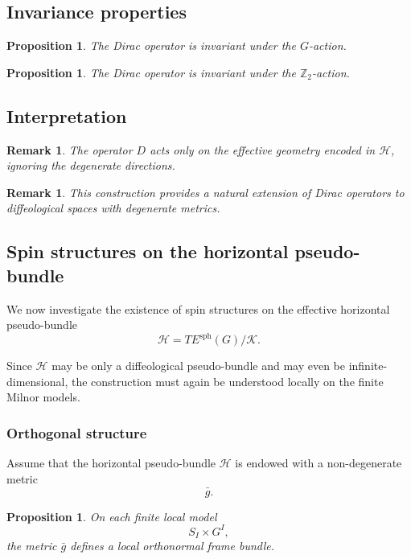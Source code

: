\documentclass[11pt]{amsart}
\newtheorem{proposition}[theorem]{Proposition}
\newtheorem{remark}[theorem]{Remark}
\begin{document}
\subsection{Invariance properties}

\begin{proposition}
The Dirac operator is invariant under the $G$-action.
\end{proposition}

\begin{proposition}
The Dirac operator is invariant under the $\mathbb{Z}_2$-action.
\end{proposition}

\subsection{Interpretation}

\begin{remark}
The operator $D$ acts only on the effective geometry encoded in $\mathcal H$, ignoring the degenerate directions.
\end{remark}

\begin{remark}
This construction provides a natural extension of Dirac operators to diffeological spaces with degenerate metrics.
\end{remark}
\subsection{Spin structures on the horizontal pseudo-bundle}

We now investigate the existence of spin structures on the effective
horizontal pseudo-bundle
\[
\mathcal H
=
TE^{\mathrm{sph}}(G)/\mathcal K.
\]

Since \(\mathcal H\) may be only a diffeological pseudo-bundle and may even be
infinite-dimensional, the construction must again be understood locally on the
finite Milnor models.

\subsubsection{Orthogonal structure}

Assume that the horizontal pseudo-bundle \(\mathcal H\) is endowed with a
non-degenerate metric
\[
\bar g.
\]

\begin{proposition}
On each finite local model
\[
S_I\times G^I,
\]
the metric \(\bar g\) defines a local orthonormal frame bundle.
\end{proposition}
\end{document}
